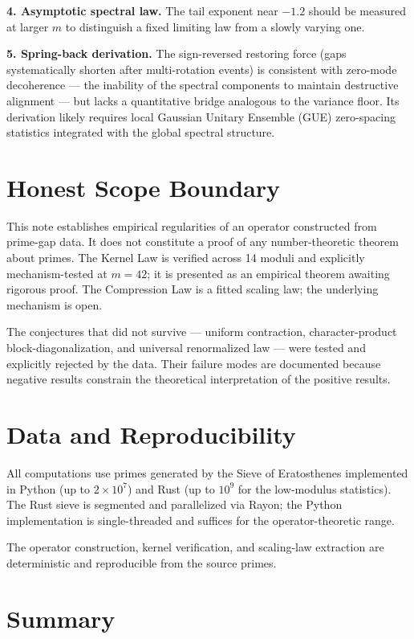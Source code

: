 \documentclass[11pt,a4paper]{article}
\begin{document}
\textbf{4. Asymptotic spectral law.} The tail exponent near $-1.2$ should be measured at larger $m$ to distinguish a fixed limiting law from a slowly varying one.

\textbf{5. Spring-back derivation.} The sign-reversed restoring force (gaps systematically shorten after multi-rotation events) is consistent with zero-mode decoherence --- the inability of the spectral components to maintain destructive alignment --- but lacks a quantitative bridge analogous to the variance floor. Its derivation likely requires local Gaussian Unitary Ensemble (GUE) zero-spacing statistics integrated with the global spectral structure.

\section{Honest Scope Boundary}

This note establishes empirical regularities of an operator constructed from prime-gap data. It does not constitute a proof of any number-theoretic theorem about primes. The Kernel Law is verified across 14 moduli and explicitly mechanism-tested at $m = 42$; it is presented as an empirical theorem awaiting rigorous proof. The Compression Law is a fitted scaling law; the underlying mechanism is open.

The conjectures that did not survive --- uniform contraction, character-product block-diagonalization, and universal renormalized law --- were tested and explicitly rejected by the data. Their failure modes are documented because negative results constrain the theoretical interpretation of the positive results.

\section{Data and Reproducibility}

All computations use primes generated by the Sieve of Eratosthenes implemented in Python (up to $2 \times 10^7$) and Rust (up to $10^9$ for the low-modulus statistics). The Rust sieve is segmented and parallelized via Rayon; the Python implementation is single-threaded and suffices for the operator-theoretic range.

The operator construction, kernel verification, and scaling-law extraction are deterministic and reproducible from the source primes.

\section{Summary}
\end{document}
